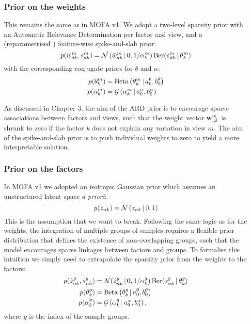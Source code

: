 \subsubsection{Prior on the weights}

This remains the same as in MOFA v1. We adopt a two-level sparsity prior with an Automatic Relevance Determination per factor and view, and a (reparametrised \cite{Titsias2011}) feature-wise spike-and-slab prior:
\begin{equation}
	p(\hat{w}_{dk}^m,s_{dk}^m) = \mathcal{N}\left(\hat{w}_{dk}^{m} \,|\, 0, 1/\alpha_{k}^{m}\right)  \text{Ber}(s_{dk}^{m} \,|\,\theta_{k}^{m})
\end{equation}
with the corresponding conjugate priors for $\theta$ and $\alpha$:
\begin{align}
	p(\theta_k^m) &= \text{Beta}\left(\theta_k^m \,|\, a_0^\theta,b_0^\theta\right)\\
	p(\alpha_k^m) &= \mathcal{G}\left(\alpha_k^m \,|\, a_0^\alpha, b_0^\alpha\right)
\end{align}

As discussed in Chapter 3, the aim of the ARD prior is to encourage sparse associations between factors and views, such that the weight vector ${\bf w}_{:,k}^m$ is shrunk to zero if the factor $k$ does not explain any variation in view $m$. The aim of the spike-and-slab prior is to push individual weights to zero to yield a more interpretable solution.

\subsubsection{Prior on the factors}

In MOFA v1 we adopted an isotropic Gaussian prior which assumes an unstructured latent space \textit{a priori}:
\begin{equation}
	p(z_{nk}) = \mathcal{N}\left(z_{nk} \,|\, 0,1\right)
\end{equation}
This is the assumption that we want to break. Following the same logic as for the weights, the integration of multiple groups of samples requires a flexible prior distribution that defines the existence of non-overlapping groups, such that the model encourages sparse linkages between factors and groups. To formalise this intuition we simply need to extrapolate the sparsity prior from the weights to the factors:
\begin{align}
	p(\hat{z}_{nk}^g,s_{nk}^g) &= \mathcal{N} (\hat{z}_{nk}^g \,|\, 0, 1/\alpha_k^g)\, \text{Ber}(s_{nk}^g \,|\,\theta_k^g) \\
	p(\theta_k^g) &= \text{Beta}\left(\theta_k^g \,|\, a_0^\theta,b_0^\theta\right) \\
	p(\alpha_k^g) &= \mathcal{G}\left(\alpha_k^g \,|\, a_0^\alpha, b_0^\alpha\right),
\end{align}
where $g$ is the index of the sample groups.

